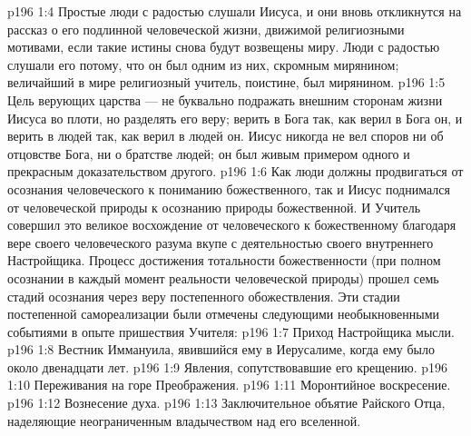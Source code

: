 \vs p196 1:4 Простые люди с радостью слушали Иисуса, и они вновь откликнутся на рассказ о его подлинной человеческой жизни, движимой религиозными мотивами, если такие истины снова будут возвещены миру. Люди с радостью слушали его потому, что он был одним из них, скромным мирянином; величайший в мире религиозный учитель, поистине, был мирянином.
\vs p196 1:5 Цель верующих царства --- не буквально подражать внешним сторонам жизни Иисуса во плоти, но разделять его веру; верить в Бога так, как верил в Бога он, и верить в людей так, как верил в людей он. Иисус никогда не вел споров ни об отцовстве Бога, ни о братстве людей; он был живым примером одного и прекрасным доказательством другого.
\vs p196 1:6 Как люди должны продвигаться от осознания человеческого к пониманию божественного, так и Иисус поднимался от человеческой природы к осознанию природы божественной. И Учитель совершил это великое восхождение от человеческого к божественному благодаря вере своего человеческого разума вкупе с деятельностью своего внутреннего Настройщика. Процесс достижения тотальности божественности (при полном осознании в каждый момент реальности человеческой природы) прошел семь стадий осознания через веру постепенного обожествления. Эти стадии постепенной самореализации были отмечены следующими необыкновенными событиями в опыте пришествия Учителя:
\vs p196 1:7 \bibnobreakspace Приход Настройщика мысли.
\vs p196 1:8 \bibnobreakspace Вестник Иммануила, явившийся ему в Иерусалиме, когда ему было около двенадцати лет.
\vs p196 1:9 \bibnobreakspace Явления, сопутствовавшие его крещению.
\vs p196 1:10 \bibnobreakspace Переживания на горе Преображения.
\vs p196 1:11 \bibnobreakspace Моронтийное воскресение.
\vs p196 1:12 \bibnobreakspace Вознесение духа.
\vs p196 1:13 \bibnobreakspace Заключительное объятие Райского Отца, наделяющие неограниченным владычеством над его вселенной.
